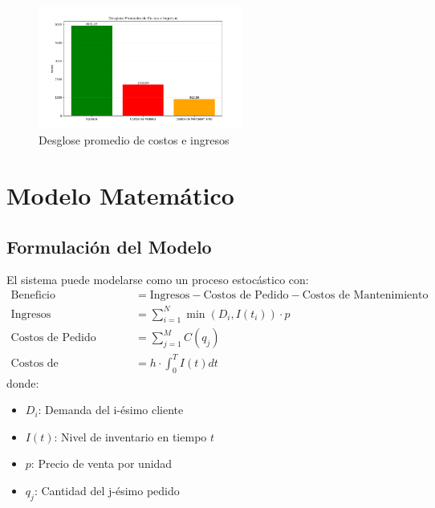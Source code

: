 \documentclass{article}
\begin{document}
\begin{figure}[h]
    \centering
    \includegraphics[width=0.6\textwidth]{images/Desglose Promedio de costos e Ingresos.png}
    \caption{Desglose promedio de costos e ingresos}
\end{figure}


\newpage
\section{Modelo Matemático}

\subsection{Formulación del Modelo}
El sistema puede modelarse como un proceso estocástico con:
\begin{align*}
\text{Beneficio} &= \text{Ingresos} - \text{Costos de Pedido} - \text{Costos de Mantenimiento} \\
\text{Ingresos} &= \sum_{i=1}^{N} \min(D_i, I(t_i)) \cdot p \\
\text{Costos de Pedido} &= \sum_{j=1}^{M} C(q_j) \\
\text{Costos de Mantenimiento} &= h \cdot \int_{0}^{T} I(t) dt
\end{align*}
donde:
\begin{itemize}
    \item $D_i$: Demanda del i-ésimo cliente
    \item $I(t)$: Nivel de inventario en tiempo $t$
    \item $p$: Precio de venta por unidad
    \item $q_j$: Cantidad del j-ésimo pedido
\end{itemize}
\end{document}
